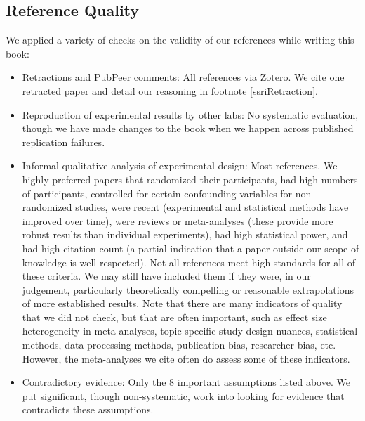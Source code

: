 \documentclass[12pt,letterpaper]{book}
\begin{document}
\subsection*{Reference Quality}
We applied a variety of checks on the validity of our references while writing this book:
\begin{itemize}
    \item Retractions and PubPeer comments: All references via Zotero. We cite one retracted paper and detail our reasoning in footnote \ref{ssriRetraction}.
    \item Reproduction of experimental results by other labs: No systematic evaluation, though we have made changes to the book when we happen across published replication failures.
    \item Informal qualitative analysis of experimental design: Most references. We highly preferred papers that randomized their participants, had high numbers of participants, controlled for certain confounding variables for non-randomized studies, were recent (experimental and statistical methods have improved over time), were reviews or meta-analyses (these provide more robust results than individual experiments), had high statistical power, and had high citation count (a partial indication that a paper outside our scope of knowledge is well-respected). Not all references meet high standards for all of these criteria. We may still have included them if they were, in our judgement, particularly theoretically compelling or reasonable extrapolations of more established results. Note that there are many indicators of quality that we did not check, but that are often important, such as effect size heterogeneity in meta-analyses, topic-specific study design nuances, statistical methods, data processing methods, publication bias, researcher bias, etc. However, the meta-analyses we cite often do assess some of these indicators.
    \item Contradictory evidence: Only the 8 important assumptions listed above. We put significant, though non-systematic, work into looking for evidence that contradicts these assumptions.
\end{itemize}
\end{document}
